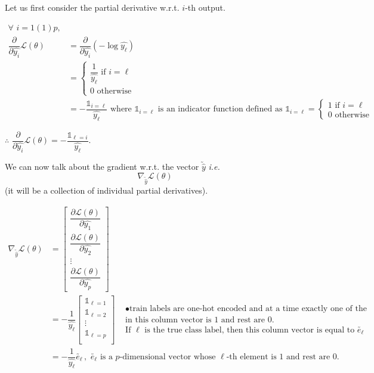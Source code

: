 \documentclass[11pt, a4paper]{article}
\begin{document}
Let us first consider the partial derivative w.r.t. $i$-th output.

\begin{align*}
\forall \,\, i = 1(1)p, \\[0.5em]
\dfrac{\partial}{\partial \hat{y_i}} \mathscr{L}(\theta) &= \dfrac{\partial}{\partial \hat{y_i}} (- \log \hat{y_\ell}) \\[0.5em]
&= \begin{cases}
\dfrac{1}{\hat{y_\ell}} \,\, \text{if } i = \ell \\[1em]
0 \,\, \text{otherwise}
\end{cases} \\[1em]
&= - \dfrac{\mathds{1}_{i = \ell}}{\hat{y_\ell}} \text{ where } \mathds{1}_{i = \ell} \text{ is an indicator function defined as } \mathds{1}_{i = \ell} = \begin{cases} 1 \text{ if } i = \ell \\ 0 \text{ otherwise } \end{cases}
\end{align*}

$\therefore \,\, \dfrac{\partial}{\partial \hat{y_i}} \mathscr{L}(\theta) = - \dfrac{\mathds{1}_{\ell = i}}{\hat{y_\ell}}.$
 
We can now talk about the gradient w.r.t. the vector $\utilde{\hat{y}}$ \textit{i.e.} $$\nabla_{\utilde{\hat{y}}} \mathscr{L}(\theta)$$ (it will be a collection of individual partial derivatives).

\begin{align*}
\nabla_{\utilde{\hat{y}}} \mathscr{L}(\theta) &= 
\begin{bmatrix}
\dfrac{\partial \mathscr{L}(\theta)}{\partial \hat{y_1}} \\[1em]
\dfrac{\partial \mathscr{L}(\theta)}{\partial \hat{y_2}} \\[1em]
\vdots \\[1em]
\dfrac{\partial \mathscr{L}(\theta)}{\partial \hat{y_p}}
\end{bmatrix} \\[0.5em]
&= - \dfrac{1}{\hat{y_\ell}} \begin{bmatrix}
\mathds{1}_{\ell = 1} \\[0.5em]
\mathds{1}_{\ell = 2} \\[0.5em]
\vdots \\[0.5em]
\mathds{1}_{\ell = p} \\[0.5em]
\end{bmatrix}
\begin{aligned}
& \bullet \text{train labels are one-hot encoded and at a time exactly one of the elements} \\ 
& \text{in this column vector is 1 and rest are 0.} \\
& \text{If } \ell \text{ is the true class label, then this column vector is equal to } \utilde{e_{\ell}} 
\end{aligned} \\[1em]
&= - \dfrac{1}{\hat{y_\ell}} \utilde{e_{\ell}} \, , \,\, \utilde{e_{\ell}} \text{ is a } p\text{-dimensional vector whose } \ell \text{-th element is 1 and rest are 0.}
\end{align*}
\end{document}
